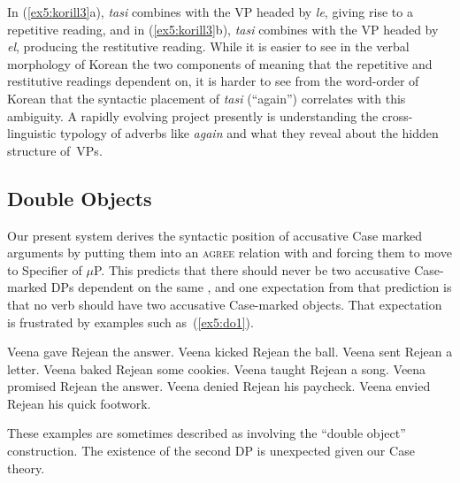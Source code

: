 In (\ref{ex5:korill3}a), \emph{tasi} combines with the VP headed by \emph{le}, giving rise to a repetitive reading, and in (\ref{ex5:korill3}b), \emph{tasi} combines with the VP headed by \emph{el}, producing the restitutive reading. While it is easier to see in the verbal morphology of Korean the two components of meaning that the repetitive and restitutive readings dependent on, it is harder to see from the word-order of Korean that the syntactic placement of \emph{tasi} (``again'') correlates with this ambiguity.%
%
%
%
 A rapidly evolving project presently is understanding the cross-linguistic typology of adverbs like \emph{again} and what they reveal about the hidden structure of~VPs.

\subsection{Double Objects} 
\label{sub:doubleobjects}

Our present system derives the syntactic position of accusative Case marked arguments by putting them into an \textsc{agree} relation with \obar{$\mu$} and forcing them to move to Specifier of $\mu$P. This predicts that there should never be two accusative Case-marked DPs dependent on the same \obar{$\mu$}, and one expectation from that prediction is that no verb should have two accusative Case-marked objects. That expectation is frustrated by examples such as~(\ref{ex5:do1}).
\pagebreak
\begin{exe}
	\raggedright
	\ex \label{ex5:do1} 
	\begin{xlist}
		\ex Veena gave Rejean the answer.
		\ex Veena kicked Rejean the ball.
		\ex Veena sent Rejean a letter.
		\ex Veena baked Rejean some cookies.
		\ex Veena taught Rejean a song.
		\ex Veena promised Rejean the answer.
		\ex \label{ex5:deny}Veena denied Rejean his paycheck.
		\ex \label{ex5:envy}Veena envied Rejean his quick footwork.
	\end{xlist}
\end{exe}
These examples are sometimes described as involving the ``double object'' construction. The existence of the second DP is unexpected given our Case theory.

